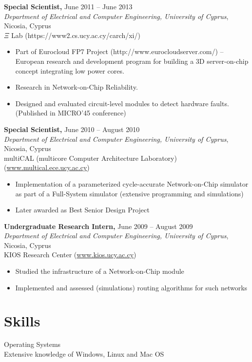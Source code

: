 \documentclass[11pt]{myres} %
\begin{document}
\begin{resume}
{\color{blue}\textbf{Special Scientist,} June 2011 -- June 2013} \\
\emph{Department of Electrical and Computer Engineering, University of Cyprus}, Nicosia, Cyprus \\
$\Xi$ Lab (https://www2.cs.ucy.ac.cy/carch/xi/) \\
\begin{itemize} \itemsep -2pt
	\item Part of Eurocloud FP7 Project (http://www.eurocloudserver.com/) -- European research and development program for building a 3D server-on-chip concept integrating low power cores.
	\item Research in Network-on-Chip Reliability.
	\item Designed and evaluated circuit-level modules to detect hardware faults. (Published in MICRO'45 conference)
\end{itemize}

{\color{blue}\textbf{Special Scientist,} June 2010 -- August 2010} \\
\emph{Department of Electrical and Computer Engineering, University of Cyprus}, Nicosia, Cyprus \\
multiCAL (multicore Computer Architecture Laboratory) (\url{www.multical.ece.ucy.ac.cy}) \\
\begin{itemize} \itemsep -2pt
	\item Implementation of a parameterized cycle-accurate Network-on-Chip simulator as part of a Full-System simulator (extensive programming and simulations)
	\item Later awarded as Best Senior Design Project
\end{itemize}

{\color{blue}\textbf{Undergraduate Research Intern,} June 2009 -- August 2009} \\
\emph{Department of Electrical and Computer Engineering, University of Cyprus}, Nicosia, Cyprus \\
KIOS Research Center (\url{www.kios.ucy.ac.cy}) \\
\begin{itemize} \itemsep -2pt
	\item Studied the infrastructure of a Network-on-Chip module
	\item Implemented and assessed (simulations) routing algorithms for such networks
\end{itemize}

\section{Skills}
{\color{blue}Operating Systems}\\
Extensive knowledge of Windows, Linux and Mac OS


\end{resume}
\end{document}
